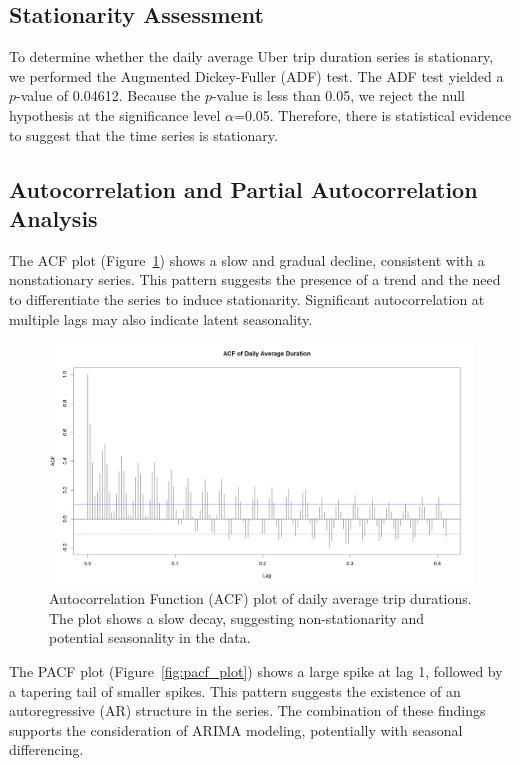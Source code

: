 \documentclass{article}
\begin{document}
\subsection{Stationarity Assessment}
To determine whether the daily average Uber trip duration series is stationary, we performed the Augmented Dickey-Fuller (ADF) test. The ADF test yielded a $p$-value of 0.04612. Because the $p$-value is less than 0.05, we reject the null hypothesis at the significance level $\alpha$=0.05. Therefore, there is statistical evidence to suggest that the time series is stationary.

\subsection{Autocorrelation and Partial Autocorrelation Analysis}
The ACF plot (Figure~\ref{fig:acf_plot}) shows a slow and gradual decline, consistent with a nonstationary series. This pattern suggests the presence of a trend and the need to differentiate the series to induce stationarity. Significant autocorrelation at multiple lags may also indicate latent seasonality.

\begin{figure}
  \includegraphics[width=\textwidth]{finalproject/images/acf-plot.png}
  \caption{Autocorrelation Function (ACF) plot of daily average trip durations. The plot shows a slow decay, suggesting non-stationarity and potential seasonality in the data.}
  \label{fig:acf_plot}
\end{figure}

The PACF plot (Figure~\ref{fig:pacf_plot}) shows a large spike at lag 1, followed by a tapering tail of smaller spikes. This pattern suggests the existence of an autoregressive (AR) structure in the series. The combination of these findings supports the consideration of ARIMA modeling, potentially with seasonal differencing.
\end{document}
